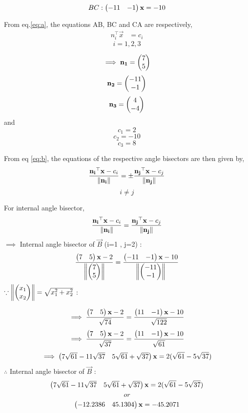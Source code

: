 \documentclass{article}
\begin{document}
\begin{itemize}
         \begin{align}
          \label{eq:f}
         BC : \begin{pmatrix}-11&-1\end{pmatrix}\mathbf{x} = -10
        \end{align}
        
        
         
From eq.\ref{eq:a}, the equations AB, BC and CA are respectively, 
                \begin{align}
                 \label{eq:g}
                 n_i^{\top}\vec{x} &= c_i
                 \end{align}      
                \[i=1,2,3\]  
            
\[ \implies  \mathbf{n_1} = \begin{pmatrix}7\\5\end{pmatrix} \]
           \[     \mathbf{n_2} = \begin{pmatrix}-11\\-1\end{pmatrix}     \]
     \[     \mathbf{n_3} = \begin{pmatrix}4\\-4\end{pmatrix} \]
            and
     \[c_1 = 2\] 
     \[c_2 = -10\]
      \[c_3 = 8\]
     
      
From eq \ref{eq:b}, the equations of the respective angle bisectors are then given by,
                 \[\frac{\mathbf{n_i}^{\top}\mathbf{x}-c_i}{\left\lVert\mathbf{n_i}\right\rVert} = \pm\frac{\mathbf{n_j}^{\top}\mathbf{x}-c_j}{\left\lVert{\mathbf{n_j}}\right\rVert}\] 
                 \[i \neq j\]
   
   For internal angle bisector, 
                 \[\frac{\mathbf{n_i}^{\top}\mathbf{x}-c_i}{\left\lVert\mathbf{n_i}\right\rVert} = \frac{\mathbf{n_j}^{\top}\mathbf{x}-c_j}{\left\lVert{\mathbf{n_j}}\right\rVert}\] 
  $\implies$ Internal angle bisector of $\vec{B}$ (i=1 , j=2) : 
                    \[\frac{\begin{pmatrix}7&5\end{pmatrix}\mathbf{x}-2}{\left\lVert\begin{pmatrix}7\\5\end{pmatrix}\right\rVert} =\frac{\begin{pmatrix}-11&-1\end{pmatrix}\mathbf{x}-10}{\left\lVert{\ensuremath{\begin{pmatrix}-11\\-1\end{pmatrix}}}\right\rVert}\] 
 $\because  \left\lVert\begin{pmatrix}x_1\\x_2\end{pmatrix}\right\rVert = \sqrt{x_1^2+x_2^2} $   :
      
  \[ \implies    \frac{\begin{pmatrix}7&5\end{pmatrix}\mathbf{x}-2}{\sqrt{74}} =\frac{\begin{pmatrix}11&-1\end{pmatrix}\mathbf{x}-10}{\sqrt{122}}\]                                
   \[ \implies    \frac{\begin{pmatrix}7&5\end{pmatrix}\mathbf{x}-2}{\sqrt{37}} =\frac{\begin{pmatrix}11&-1\end{pmatrix}\mathbf{x}-10}{\sqrt{61}}\]                                                             
    \[ \implies    \begin{pmatrix}7\sqrt{61}-11\sqrt{37}&5\sqrt{61}+\sqrt{37}\end{pmatrix}\mathbf{x} =2(\sqrt{61}-5\sqrt{37})\]    
         $\therefore$ Internal angle bisector of $\vec{B}$ :
          \[   \begin{pmatrix}7\sqrt{61}-11\sqrt{37}&5\sqrt{61}+\sqrt{37}\end{pmatrix}\mathbf{x}=2(\sqrt{61}-5\sqrt{37})\] 
          \[or\]
     \[\begin{pmatrix}-12.2386&45.1304\end{pmatrix}\mathbf{x} =-45.2071 \]                           
     

\end{itemize}
\end{document}
